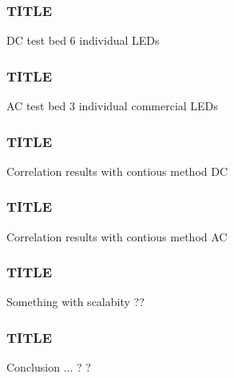 \documentclass{beamer}
\begin{document}
	\begin{frame}\frametitle{TITLE}
		DC test bed 6 individual LEDs
	\end{frame}

	\begin{frame}\frametitle{TITLE}
		AC test bed 3 individual commercial LEDs
	\end{frame}

	\begin{frame}\frametitle{TITLE}
		Correlation results with contious method DC
	\end{frame}

	\begin{frame}\frametitle{TITLE}
		Correlation results with contious method AC
	\end{frame}





	\begin{frame}\frametitle{TITLE}
		Something with scalabity ??
	\end{frame}


	\begin{frame}\frametitle{TITLE}
		Conclusion ... ? ? 
	\end{frame}
\end{document}
